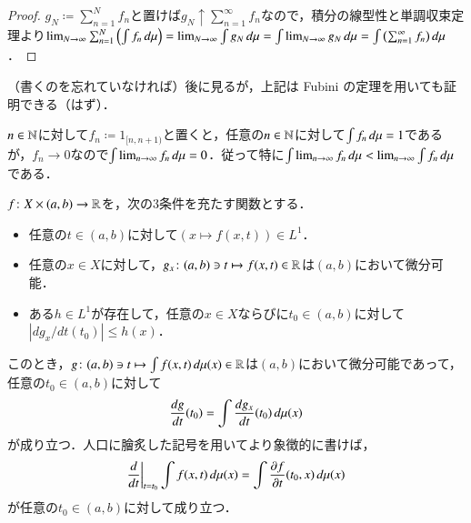 \begin{proof}
$g_N \coloneqq  \sum_{n=1}^N f_n$と置けば$g_N \uparrow \sum_{n=1}^\infty f_n$なので，積分の線型性と単調収束定理より$\lim_{N\to\infty} \sum_{n=1}^N \left(\int f_n \mathop{}\!d \mu\right) = \lim_{N \to \infty} \int g_N \mathop{}\!d \mu = \int \lim_{N \to \infty} g_N \mathop{}\!d \mu = \int  \left(\sum_{n=1}^\infty f_n\right) \mathop{}\!d \mu$．
\end{proof}

\begin{dig}（書くのを忘れていなければ）後に見るが，上記は Fubini の定理を用いても証明できる（はず）．
\end{dig}

\begin{exm}
$n \in \mathbb{N}$に対して$f_n \coloneqq 1_{[n,n+1)}$と置くと，任意の$n \in \mathbb{N}$に対して$\int f_n \mathop{}\!d \mu = 1$であるが，$f_n \to 0$なので$\int \lim_{n\to\infty}f_n \mathop{}\!d \mu=0$．従って特に$\int \lim_{n\to\infty}f_n \mathop{}\!d \mu < \lim_{n\to\infty} \int f_n \mathop{}\!d \mu$である．
\end{exm}

\begin{thm}[微分と積分の交換]\label{微分と積分の交換}
$f \colon X \times (a,b) \to \mathbb{R}$を，次の3条件を充たす関数とする．
\begin{itemize}
\item 任意の$t \in (a,b)$に対して$(x \mapsto f(x,t)) \in L^1$．
\item 任意の$x \in X$に対して，$g_x \colon (a,b) \ni t \mapsto f(x,t) \in \mathbb{R}$は$(a,b)$において微分可能．
\item ある$h \in L^1$が存在して，任意の$x \in X$ならびに$t_0 \in (a,b)$に対して$\left| d g_x / dt (t_0) \right| \leq h(x)$．
\end{itemize}
このとき，$g \colon (a,b) \ni t \mapsto \int f(x,t) \mathop{}\!d \mu(x) \in \mathbb{R}$は$(a,b)$において微分可能であって，任意の$t_0 \in (a,b)$に対して
\begin{equation}
\frac{dg}{dt}(t_0) = \int \frac{d g_x}{dt}(t_0) \mathop{}\!d \mu(x)
\end{equation}が成り立つ．人口に膾炙した記号を用いてより象徴的に書けば，
\begin{equation}
\frac{d}{dt}\bigg|_{t=t_0} \int f(x,t) \mathop{}\!d \mu(x)  = \int \frac{\partial f}{\partial t} (t_0,x) \mathop{}\!d \mu(x)
\end{equation}が任意の$t_0 \in (a,b)$に対して成り立つ．
\end{thm}

